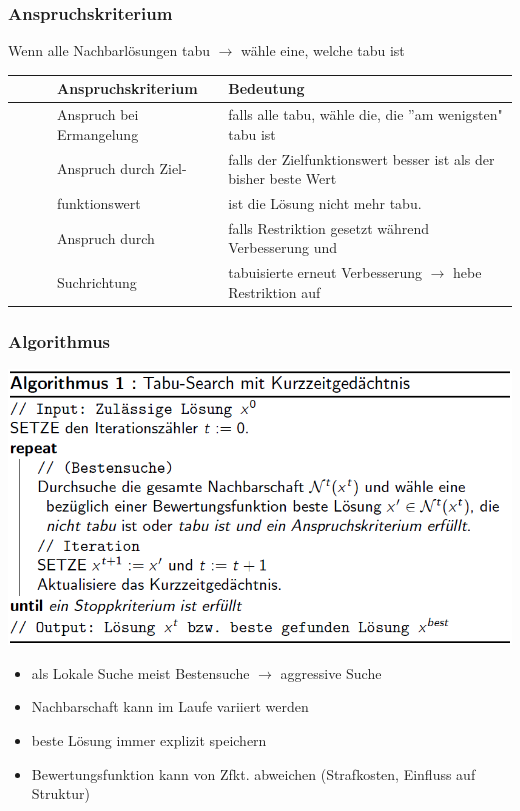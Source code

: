 \documentclass[12pt]{article}
\newcommand{\tabitem}{~~\llap{\textbullet}~~}
\begin{document}
			\subsubsection{Anspruchskriterium}
				\begin{center}
					Wenn alle Nachbarlösungen tabu $\rightarrow$ wähle eine, welche tabu ist
				\end{center}
				\begin{tabular}{c l l}
					 & Anspruchskriterium & Bedeutung \\ \hline
					\tabitem & Anspruch bei Ermangelung & falls alle tabu, wähle die, die ''am wenigsten" tabu ist \\
					\tabitem & Anspruch durch Ziel- & falls der Zielfunktionswert besser ist als der bisher beste Wert\\
					 & funktionswert & ist die Lösung nicht mehr tabu. \\
					\tabitem & Anspruch durch & falls Restriktion gesetzt während Verbesserung und\\
					 & Suchrichtung &  tabuisierte erneut Verbesserung $\rightarrow$ hebe Restriktion auf\\
				\end{tabular}
			\subsubsection{Algorithmus}
				\includegraphics[scale=0.6]{TabuSearch}	
				\begin{itemize}
					\item als Lokale Suche meist Bestensuche $\rightarrow$ aggressive Suche
					\item Nachbarschaft kann im Laufe variiert werden
					\item beste Lösung immer explizit speichern
					\item Bewertungsfunktion kann von Zfkt. abweichen (Strafkosten, Einfluss auf Struktur)
				\end{itemize}
				
\end{document}
